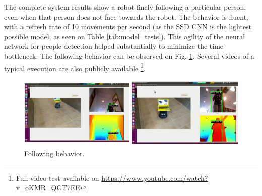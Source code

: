 The complete system results show a robot finely following a particular person, even when that person does not face towards the robot. The behavior is fluent, with a refresh rate of 10 movements per second (as the SSD CNN is the lightest possible model, as seen on Table \ref{tab:model_tests}). This agility of the neural network for people detection helped substantially to minimize the time bottleneck. The following behavior can be observed on Fig. \ref{fig:exp_following}. Several videos of a typical execution are also publicly available \footnote{Full video test available on \url{https://www.youtube.com/watch?v=oKMR_QCT7EE}}.

\begin{figure}[h!]
	\centering
	\includegraphics[width=12cm]{images/followperson_working2.png}
	\caption{Following behavior.}
	\label{fig:exp_following}
\end{figure}